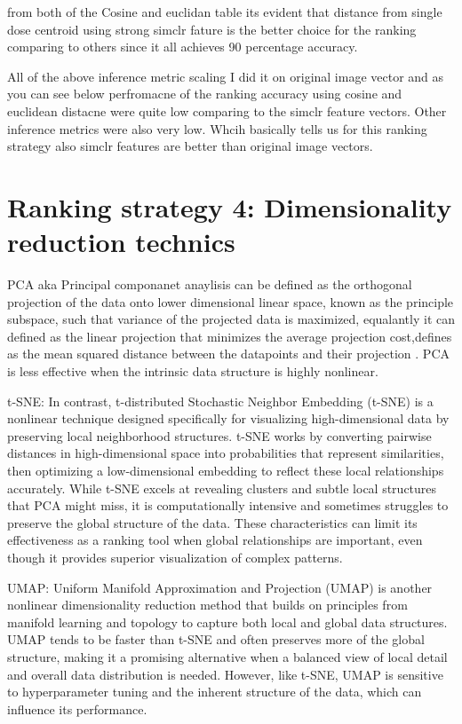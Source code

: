 from both of the Cosine and euclidan table its evident that distance from single dose centroid using strong simclr fature is the better choice for the ranking comparing to others since it all achieves 90 percentage accuracy.

All of the above inference metric scaling  I did it on original image vector and as you can see below perfromacne of the ranking accuracy using cosine and euclidean distacne were quite low comparing to the simclr feature vectors. Other inference metrics were also very low. Whcih basically tells us for this ranking strategy also simclr features are better than original image vectors.



\section{ Ranking strategy 4: Dimensionality reduction technics}



PCA  aka Principal componanet anaylisis can be defined as the orthogonal projection of the data onto lower dimensional linear space, known as the principle subspace, such that variance of the projected data is maximized, equalantly it can defined as the linear projection that minimizes the average projection cost,defines as the mean squared distance between the datapoints and their projection \cite{bishop:2006:PRML}.  PCA is less effective when the intrinsic data structure is highly nonlinear.

t-SNE: In contrast, t-distributed Stochastic Neighbor Embedding (t-SNE) is a nonlinear technique designed specifically for visualizing high-dimensional data by preserving local neighborhood structures. t-SNE works by converting pairwise distances in high-dimensional space into probabilities that represent similarities, then optimizing a low-dimensional embedding to reflect these local relationships accurately. While t-SNE excels at revealing clusters and subtle local structures that PCA might miss, it is computationally intensive and sometimes struggles to preserve the global structure of the data. These characteristics can limit its effectiveness as a ranking tool when global relationships are important, even though it provides superior visualization of complex patterns.

UMAP: Uniform Manifold Approximation and Projection (UMAP) is another nonlinear dimensionality reduction method that builds on principles from manifold learning and topology to capture both local and global data structures. UMAP tends to be faster than t-SNE and often preserves more of the global structure, making it a promising alternative when a balanced view of local detail and overall data distribution is needed. However, like t-SNE, UMAP is sensitive to hyperparameter tuning and the inherent structure of the data, which can influence its performance.

